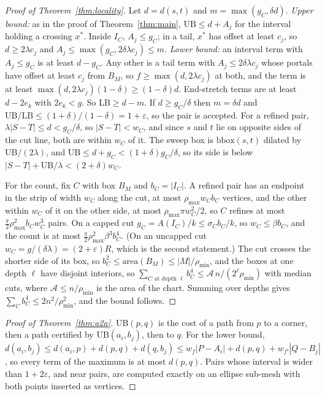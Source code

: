 \documentclass[sigconf,nonacm,screen]{acmart}
\newcommand{\LB}{\mathrm{LB}}
\newcommand{\UB}{\mathrm{UB}}
\newcommand{\eps}{\varepsilon}
\begin{document}
\begin{proof}[Proof of Theorem~\ref{thm:locality}]
Let $d=d(s,t)$ and $m=\max(g_C,\delta d)$. \emph{Upper bound:} as in the proof of Theorem~\ref{thm:main},
$\UB\le d+A_j$ for the interval holding a crossing $x^\ast$. Inside $I_C$, $A_j\le g_C$; in a tail, $x^\ast$ has offset
at least $c_j$, so $d\ge2\lambda c_j$ and $A_j\le\max(g_C,2\delta\lambda c_j)\le m$. \emph{Lower bound:} an interval
term with $A_j\le g_C$ is at least $d-g_C$. Any other is a tail term with $A_j\le2\delta\lambda c_j$ whose portals
have offset at least $c_j$ from $B_M$, so $f\ge\max(d,2\lambda c_j)$ at both, and the term is at least
$\max(d,2\lambda c_j)(1-\delta)\ge(1-\delta)d$. End-stretch terms are at least $d-2e_k$ with $2e_k<g$. So
$\LB\ge d-m$. If $d\ge g_C/\delta$ then $m=\delta d$ and $\UB/\LB\le(1+\delta)/(1-\delta)=1+\eps$, so the pair is
accepted. For a refined pair, $\lambda|S-T|\le d<g_C/\delta$, so $|S-T|<w_C$, and since $s$ and $t$ lie on opposite
sides of the cut line, both are within $w_C$ of it. The sweep box is $\mathrm{bbox}(s,t)$ dilated by
$\UB/(2\lambda)$, and $\UB\le d+g_C<(1+\delta)g_C/\delta$, so its side is below $|S-T|+\UB/\lambda<(2+\delta)w_C$.

For the count, fix $C$ with box $B_M$ and $b_C=|I_C|$. A refined pair has an endpoint in the strip of width $w_C$
along the cut, at most $\rho_{\max}w_Cb_C$ vertices, and the other within $w_C$ of it on the other side, at most
$\rho_{\max}\pi w_C^2/2$, so $C$ refines at most $\frac\pi2\rho_{\max}^2b_Cw_C^3$ pairs. On a capped cut
$g_C=A(I_C)/k\le\sigma_Cb_C/k$, so $w_C\le\beta b_C$, and the count is at most $\frac\pi2\rho_{\max}^2\beta^3b_C^4$.
(On an uncapped cut $w_C=g/(\delta\lambda)=(2+\eps)R$, which is the second statement.) The cut crosses the
shorter side of its box, so $b_C^2\le\mathrm{area}(B_M)\le|M|/\rho_{\min}$, and the boxes at one depth $\ell$ have
disjoint interiors, so $\sum_{C\text{ at depth }\ell}b_C^4\le\mathcal A\,n/(2^\ell\rho_{\min})$ with median cuts,
where $\mathcal A\le n/\rho_{\min}$ is the area of the chart. Summing over depths gives
$\sum_Cb_C^4\le2n^2/\rho_{\min}^2$, and the bound follows.
\end{proof}

\begin{proof}[Proof of Theorem~\ref{thm:a2a}]
$\UB(p,q)$ is the cost of a path from $p$ to a corner, then a path certified by $\UB(a_i,b_j)$, then to $q$. For the
lower bound, $d(a_i,b_j)\le d(a_i,p)+d(p,q)+d(q,b_j)\le w_f|P-A_i|+d(p,q)+w_{f'}|Q-B_j|$, so every term of the
maximum is at most $d(p,q)$. Pairs whose interval is wider than $1+2\eps$, and near pairs, are computed exactly on an
ellipse sub-mesh with both points inserted as vertices.
\end{proof}
\end{document}
